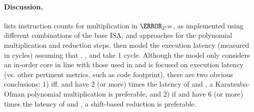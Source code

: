 \paragraph{Discussion.}

lists instruction counts for 
multiplication in $\F_{2^{128}}$,
as implemented using different combinations of the base ISA, and approaches
for the polynomial multiplication and reduction steps.
then model the execution latency 
(measured in cycles)
assuming that , , and  take $1$ cycle.
Although the model only considers an in-order core in line with those used
in  and is focused on execution latency
(vs. other pertinent metrics, such as code footprint),
there are two obvious conclusions:
1) iff.
    and 
   have $2$ (or more) times the latency of
    and ,
   a 
   Karatsuba-Ofman 
   polynomial multiplication
   is preferable,
   and
2) if
    and 
   have $6$ (or more) times the latency of
    and ,
   a shift-based 
   reduction 
   is preferable.

